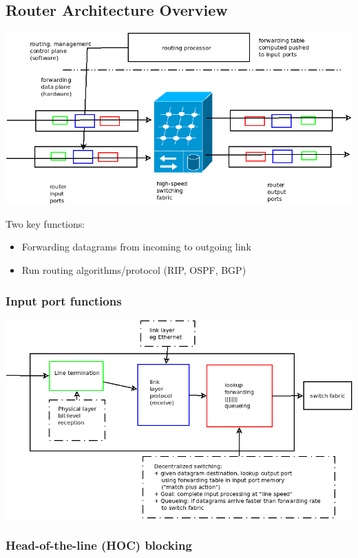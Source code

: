 \documentclass[11pt]{article}
\begin{document}
\subsection{Router Architecture Overview}
\label{sec:org09a56f2}

\begin{center}
\includegraphics[width=.9\linewidth]{../img/routerArchitecture.png}
\end{center}

Two key functions:
\begin{itemize}
\item Forwarding datagrams from incoming to outgoing link
\item Run routing algorithms/protocol (RIP, OSPF, BGP)
\end{itemize}


\subsubsection{Input port functions}
\label{sec:orgd123eea}

\begin{center}
\includegraphics[width=.9\linewidth]{../img/inputPortFunctions.png}
\end{center}

\subsubsection{Head-of-the-line (HOC) blocking}
\label{sec:orga478ca5}
\end{document}
